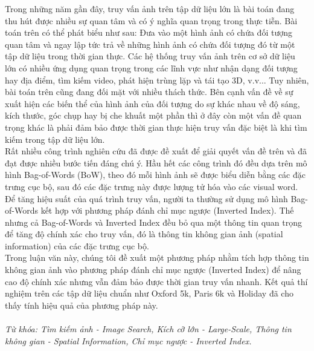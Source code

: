 \begin{abstracts}         
Trong những năm gần đây, truy vấn ảnh trên tập dữ liệu lớn là bài toán đang thu hút được nhiều sự quan tâm và có ý nghĩa quan trọng trong thực tiễn. Bài toán trên có thể phát biểu như sau: Đưa vào một hình ảnh có chứa đối tượng quan tâm và ngay lập tức trả về những hình ảnh có chứa đối tượng đó từ một tập dữ liệu trong thời gian thực. Các hệ thống truy vấn ảnh trên cơ sở dữ liệu lớn có nhiều ứng dụng quan trọng trong các lĩnh vực như nhận dạng đối tượng hay địa điểm, tìm kiếm video, phát hiện trùng lặp và tái tạo 3D, v.v... Tuy nhiên, bài toán trên cũng đang đối mặt với nhiều thách thức. Bên cạnh vấn đề về sự xuất hiện các biến thể của hình ảnh của đối tượng do sự khác nhau về độ sáng, kích thước, góc chụp hay bị che khuất một phần thì ở đây còn một vấn đề quan trọng khác là phải đảm bảo được thời gian thực hiện truy vấn đặc biệt là khi tìm kiếm trong tập dữ liệu lớn.\\
Rất nhiều công trình nghiên cứu đã được đề xuất để giải quyết vấn đề trên và đã đạt được nhiều bước tiến đáng chú ý. Hầu hết các công trình đó đều dựa trên mô hình Bag-of-Words (BoW), theo đó mỗi hình ảnh sẽ được biểu diễn bằng các đặc trưng cục bộ, sau đó các đặc trưng này được lượng tử hóa vào các visual word. Để tăng hiệu suất của quá trình truy vấn, người ta thường sử dụng mô hình Bag-of-Words kết hợp với phương pháp đánh chỉ mục ngược (Inverted Index). Thế nhưng cả Bag-of-Words và Inverted Index đều bỏ qua một thông tin quan trọng để tăng độ chính xác cho truy vấn, đó là thông tin không gian ảnh (spatial information) của các đặc trưng cục bộ. \\
Trong luận văn này, chúng tôi đề xuất một phương pháp nhằm tích hợp thông tin không gian ảnh vào phương pháp đánh chỉ mục ngược (Inverted Index) để nâng cao độ chính xác nhưng vẫn đảm bảo được thời gian truy vấn nhanh. Kết quả thí nghiệm trên các tập dữ liệu chuẩn như Oxford 5k, Paris 6k và Holiday đã cho thấy tính hiệu quả của phương pháp này.\\
\\
\textit{Từ khóa: Tìm kiếm ảnh - Image Search, Kích cỡ lớn - Large-Scale, Thông tin không gian - Spatial Information, Chỉ mục ngược - Inverted Index.}

\end{abstracts}
 